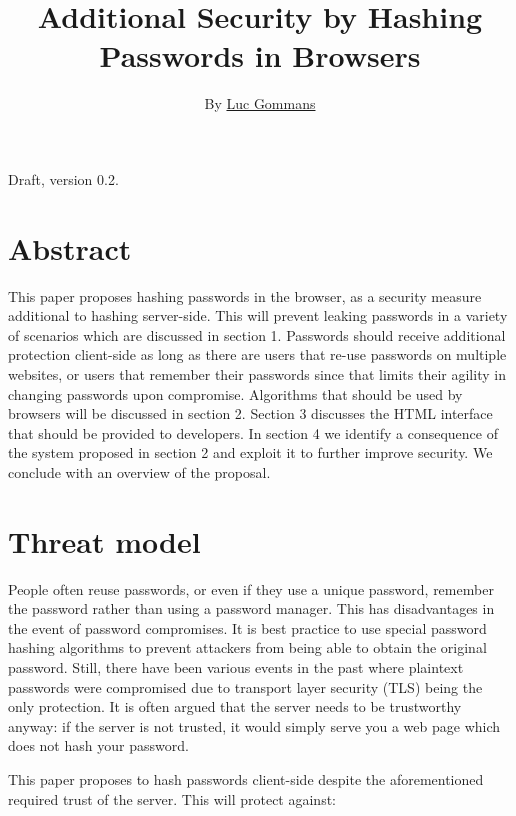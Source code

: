 \documentclass{paper}
\begin{document}
\title{Additional Security by Hashing Passwords in Browsers}
\author{By \href{https://lgms.nl}{Luc Gommans}}

\maketitle

Draft, version 0.2.

\section*{Abstract}

This paper proposes hashing passwords in the browser, as a security measure additional to
hashing server-side. This will prevent leaking passwords in a variety of scenarios which are
discussed in section 1. Passwords should receive additional protection client-side as long as
there are users that re-use passwords on multiple websites, or users that remember their
passwords since that limits their agility in changing passwords upon compromise. Algorithms
that should be used by browsers will be discussed in section 2. Section 3 discusses the HTML
interface that should be provided to developers. In section 4 we identify a consequence of
the system proposed in section 2 and exploit it to further improve security. We conclude with
an overview of the proposal.

\section{Threat model}

People often reuse passwords, or even if they use a unique password, remember the password
rather than using a password manager. This has disadvantages in the event of password
compromises. It is best practice to use special password hashing algorithms to prevent
attackers from being able to obtain the original password. Still, there have been various
events in the past where plaintext passwords were compromised due to transport layer security
(TLS) being the only protection. It is often argued that the server needs to be trustworthy
anyway: if the server is not trusted, it would simply serve you a web page which does not
hash your password.

This paper proposes to hash passwords client-side despite the aforementioned required trust
of the server. This will protect against:
\end{document}
